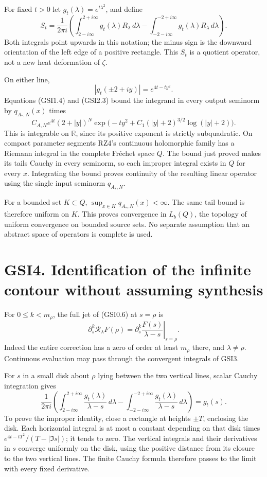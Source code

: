 For fixed \(t>0\) let \(g_t(\lambda)=e^{t\lambda^2}\), and define \[
S_t=\frac1{2\pi i}\left(
\int_{2-i\infty}^{2+i\infty}g_t(\lambda)R_\lambda\,d\lambda
-\int_{-2-i\infty}^{-2+i\infty}g_t(\lambda)R_\lambda\,d\lambda
\right).
\tag{GSI3.1}
\] Both integrals point upwards in this notation; the minus sign is the
downward orientation of the left edge of a positive rectangle. This
\(S_t\) is a quotient operator, not a new heat deformation of \(\zeta\).

On either line, \[
|g_t(\pm2+iy)|=e^{4t-ty^2}.
\tag{GSI3.2}
\] Equations (GSI1.4) and (GSI2.3) bound the integrand in every output
seminorm by \(q_{A_*,N}(x)\) times \[
C_{A,N}e^{4t}(2+|y|)^N
\exp\bigl(-ty^2+C_1(|y|+2)^{3/2}\log(|y|+2)\bigr).
\tag{GSI3.3}
\] This is integrable on \(\mathbb R\), since its positive exponent is
strictly subquadratic. On compact parameter segments RZ4's continuous
holomorphic family has a Riemann integral in the complete Fréchet space
\(Q\). The bound just proved makes its tails Cauchy in every seminorm,
so each improper integral exists in \(Q\) for every \(x\). Integrating
the bound proves continuity of the resulting linear operator using the
single input seminorm \(q_{A_*,N}\).

For a bounded set \(K\subset Q\), \(\sup_{x\in K}q_{A_*,N}(x)<\infty\).
The same tail bound is therefore uniform on \(K\). This proves
convergence in \(L_b(Q)\), the topology of uniform convergence on
bounded source sets. No separate assumption that an abstract space of
operators is complete is used.

\section{GSI4. Identification of the infinite contour without assuming
synthesis}\label{gsi4.-identification-of-the-infinite-contour-without-assuming-synthesis}

For \(0\le k<m_\rho\), the full jet of (GSI0.6) at \(s=\rho\) is \[
\partial_s^k\mathscr R_\lambda F(\rho)
=\left.\partial_s^k\frac{F(s)}{\lambda-s}\right|_{s=\rho}.
\tag{GSI4.1}
\] Indeed the entire correction has a zero of order at least \(m_\rho\)
there, and \(\lambda\ne\rho\). Continuous evaluation may pass through
the convergent integrals of GSI3.

For \(s\) in a small disk about \(\rho\) lying between the two vertical
lines, scalar Cauchy integration gives \[
\frac1{2\pi i}\left(
\int_{2-i\infty}^{2+i\infty}\frac{g_t(\lambda)}{\lambda-s}\,d\lambda
-\int_{-2-i\infty}^{-2+i\infty}\frac{g_t(\lambda)}{\lambda-s}\,d\lambda
\right)=g_t(s).
\tag{GSI4.2}
\] To prove the improper identity, close a rectangle at heights
\(\pm T\), enclosing the disk. Each horizontal integral is at most a
constant depending on that disk times \(e^{4t-tT^2}/(T-|\Im s|)\); it
tends to zero. The vertical integrals and their derivatives in \(s\)
converge uniformly on the disk, using the positive distance from its
closure to the two vertical lines. The finite Cauchy formula therefore
passes to the limit with every fixed derivative.


